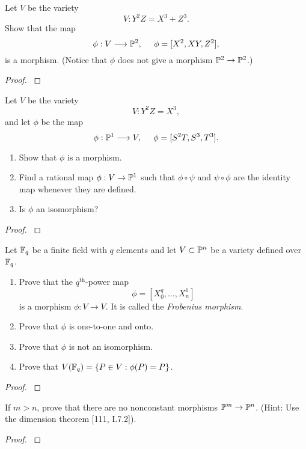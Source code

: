 \documentclass[12pt,reqno]{amsart}
\begin{document}
\begin{exe}\label{1.6}
Let $V$ be the variety
\[
V : Y^2Z = X^3+Z^3.
\]
Show that the map
\[
\phi: V \longrightarrow {\mathbb P}^2,\;\;\;\;\;\phi=[X^2, XY, Z^2],
\]
is a morphism.  (Notice that $\phi$ does not give a morphism ${\mathbb P}^2 \to {\mathbb P}^2$.)
\begin{proof}\label{s1.6}

\end{proof} 
\end{exe} 

\begin{exe}\label{1.7}
Let $V$ be the variety
\[
V : Y^2Z=X^3,
\]
and let $\phi$ be the map
\[
\phi: {\mathbb P}^1 \longrightarrow V, \;\;\;\;\;\phi=[S^2T, S^3, T^3].
\]
\begin{enumerate}
\item
Show that $\phi$ is a morphism.
\item
Find a rational map $\phi: V \to {\mathbb P}^1$ such that $\phi \circ \psi$ and $\psi \circ \phi$ are the identity map whenever they are defined. 
\item
Is $\phi$ an isomorphism?
\end{enumerate}
\begin{proof}\label{s1.7}

\end{proof} 
\end{exe} 

\begin{exe}\label{1.8}
Let ${\mathbb F}_q$ be a finite field with $q$ elements and let $V \subset {\mathbb P}^n$ be a variety defined over ${\mathbb F}_q$.
\begin{enumerate}
\item
Prove that the $q^{\text{th}}$-power map
\[
\phi=[X_0^q, \hdots, X_n^1]
\]
is a morphism $\phi: V \to V$. It is called the \emph{Frobenius morphism}.
\item
Prove that $\phi$ is one-to-one and onto.
\item
Prove that $\phi$ is not an isomorphism.
\item
Prove that $V({\mathbb F}_q)=\{ P\in V : \phi(P)=P \}$.
\end{enumerate}
\begin{proof}\label{s1.8}

\end{proof} 
\end{exe} 

\begin{exe}\label{1.9}
If $m>n$, prove that there are no nonconstant morphisms ${\mathbb P}^m \to {\mathbb P}^n$.  (Hint: Use the dimension theorem [111, I.7.2]).
\begin{proof}\label{s1.9}

\end{proof} 
\end{exe} 
\end{document}
